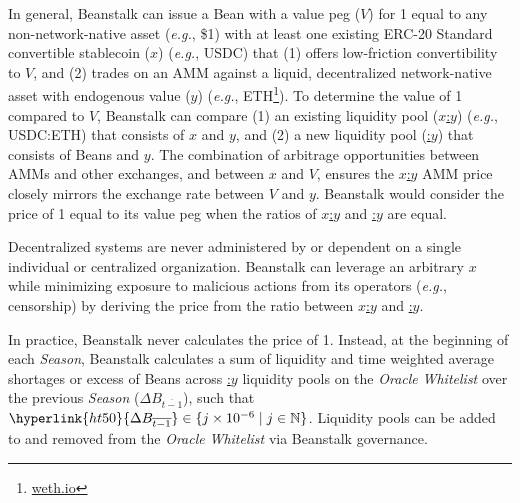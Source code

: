 \documentclass[tikz]{article}
\newcommand{\term}[1]{\textsl{#1}}
\newcommand{\fref}[1]{\footnote{\href{http://#1}{#1}}}
\newcommand{\Bean}{} %
\begin{document}
In general, Beanstalk can issue a Bean with a value peg (\hyperlink{ht216}{$V$}) for \Bean1 equal to any non-network-native asset (\term{e.g.}, \$1) with at least one existing ERC-20 Standard convertible stablecoin (\hyperlink{ht223}{$x$}) (\term{e.g.}, USDC) that (1) offers low-friction convertibility to \hyperlink{ht216}{$V$}, and (2) trades on an AMM against a liquid, decentralized network-native asset with endogenous value (\hyperlink{ht227}{$y$}) (\term{e.g.}, ETH\fref{weth.io}). To determine the value of \Bean1 compared to \hyperlink{ht216}{$V$}, Beanstalk can compare (1) an existing liquidity pool (\hyperlink{ht224}{$x$:$y$}) (\term{e.g.}, USDC:ETH) that consists of \hyperlink{ht223}{$x$} and \hyperlink{ht227}{$y$}, and (2) a new liquidity pool (\hyperlink{ht6}{\Bean:$y$}) that consists of Beans and \hyperlink{ht227}{$y$}. The combination of arbitrage opportunities between AMMs and other exchanges, and between \hyperlink{ht223}{$x$} and \hyperlink{ht216}{$V$}, ensures the \hyperlink{ht224}{$x$:$y$} AMM price closely mirrors the exchange rate between \hyperlink{ht216}{$V$} and \hyperlink{ht227}{$y$}. Beanstalk would consider the price of \Bean1 equal to its value peg when the ratios of \hyperlink{ht224}{$x$:$y$} and \hyperlink{ht6}{\Bean:$y$} are equal.

Decentralized systems are never administered by or dependent on a single individual or centralized organization. Beanstalk can leverage an arbitrary \hyperlink{ht223}{$x$} while minimizing exposure to malicious actions from its operators (\term{e.g.}, censorship) by deriving the price from the ratio between \hyperlink{ht224}{$x$:$y$} and \hyperlink{ht6}{\Bean:$y$}.

In practice, Beanstalk never calculates the price of \Bean1. Instead, at the beginning of each \term{Season}, Beanstalk calculates a sum of liquidity and time weighted average shortages or excess of Beans across \hyperlink{ht6}{\Bean:$y$} liquidity pools on the \term{Oracle} \term{Whitelist} over the previous \term{Season} (\hyperlink{ht50}{$\Delta B_{\overline{t-1}}$}), such that $\hyperlink{ht50}{\Delta B_{\overline{t-1}}} \in \{j \times 10^{-6} \mid j \in \mathbb{N} \}$. Liquidity pools can be added to and removed from the \term{Oracle} \term{Whitelist} via Beanstalk governance. 
\end{document}
